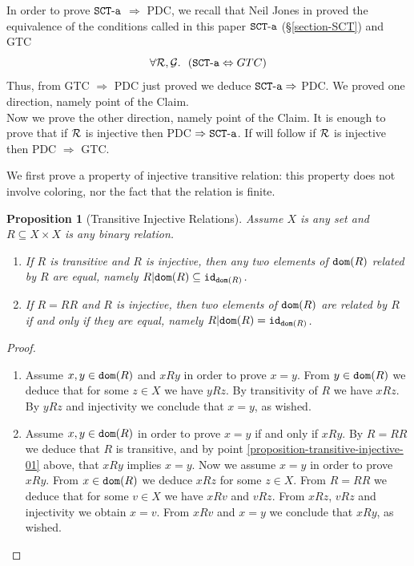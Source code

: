 \documentclass{lmcs}
\newtheorem{proposition}[theorem]{Proposition}
\begin{document}
In order to prove ${\tt SCT\mbox{-}a}$ $\Rightarrow$ PDC, we recall 
that Neil Jones in \cite{Lee1} 
proved the equivalence of the conditions called in this paper 
${\tt SCT\mbox{-}a}$ (\S \ref{section-SCT}) and GTC
$$
\forall \setR, \setG.  \ \ 
(\SCTa \Leftrightarrow GTC)
$$
Thus, from GTC $\Rightarrow$ PDC just proved we deduce ${\tt SCT\mbox{-}a} \Rightarrow$ PDC. 
We proved one direction, namely point \label{property-2} of the Claim.
\\

Now we prove the other direction, namely point \label{property-1} of the Claim.
It is enough to prove that if ${\mathcal R}$ is injective then PDC $\Rightarrow {\tt SCT\mbox{-}a}$. If will follow
if ${\mathcal R}$ is injective then PDC $\Rightarrow$ GTC. 

We first prove a property of injective transitive relation: this property does not
involve coloring, nor the fact that the relation is finite.

\begin{proposition}[Transitive Injective Relations]
\label{proposition-transitive-injective}
Assume $X$ is any set and $R \subseteq X \times X$ is any binary relation.
\begin{enumerate}
\item
\label{proposition-transitive-injective-01}
If $R$ is transitive and $R$ is injective, then any two elements of ${\tt dom}(R)$ related by $R$ 
are equal, namely $R {|} {\tt dom}(R) \subseteq {\tt id}_{{\tt dom}(R)}$.
\item
\label{proposition-transitive-injective-02}
If $R=RR$ and $R$ is injective, then two elements of ${\tt dom}(R)$ are related by $R$ 
\emph{if and only if} they are equal, namely $R {|} {\tt dom}(R) = {\tt id}_{{\tt dom}(R)}$.
\end{enumerate}
\end{proposition} 

\begin{proof}
\begin{enumerate}
\item
Assume $x, y \in {\tt dom}(R)$ and $x R y$ in order to prove $x = y$. 
From $y \in {\tt dom}(R)$ we deduce that for some
$z \in X$ we have $y R z$. By transitivity of $R$ we have $x R z$. By $y R z$ and injectivity
we conclude that $x = y$, as wished.

\item
Assume $x, y \in {\tt dom}(R)$ in order to prove $x = y$ if and only if $x R y$. By $R=RR$
we deduce that $R$ is transitive, and by point \ref{proposition-transitive-injective-01} above,
that $x R y$ implies $x=y$. Now we assume $x=y$ in order to prove $x R y$. 
From $x \in {\tt dom}(R)$ we deduce $x R z$ for some $z \in X$. From $R =RR$ we deduce
that for some $v \in X$ we have $x R v$ and $v R z$. From $x R z$, $v R z$ and injectivity
we obtain $x = v$. From $x R v$ and $x = y$ we conclude that $x R y$,
as wished.
\end{enumerate}
\end{proof}
\end{document}
